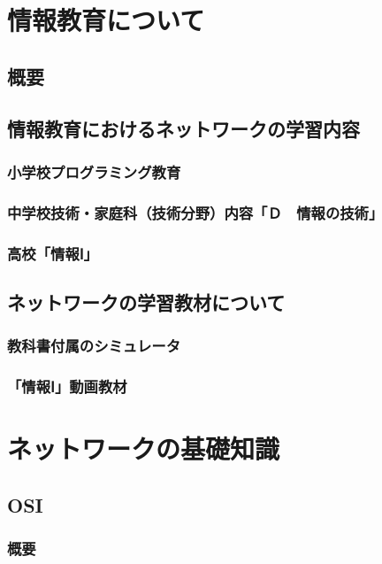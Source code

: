 \documentclass[12pt,a4j,titlepage]{ltjsarticle}
\begin{document}
\clearpage
\section{情報教育について}
\subsection{概要}
\subsection{情報教育におけるネットワークの学習内容}
\subsubsection{小学校プログラミング教育}
\subsubsection{中学校技術・家庭科（技術分野）内容「Ｄ　情報の技術」}
\subsubsection{高校「情報Ⅰ」}
\subsection{ネットワークの学習教材について}
\subsubsection{教科書付属のシミュレータ}
\subsubsection{「情報Ⅰ」動画教材}

\clearpage
\section{ネットワークの基礎知識}
\subsection{OSI}
\subsubsection{概要}
\end{document}
